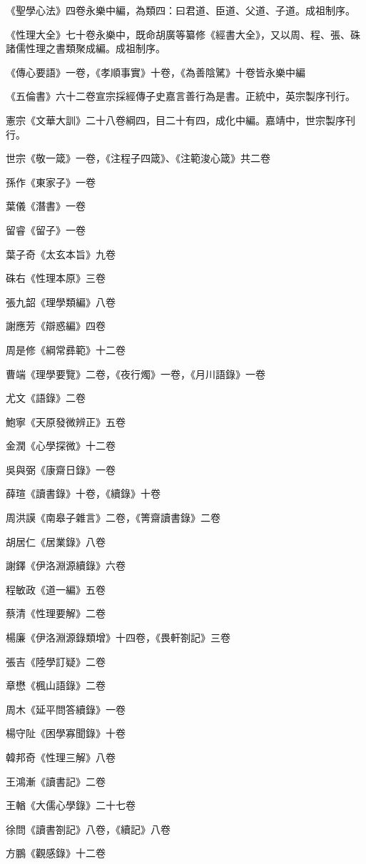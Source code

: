 《聖學心法》四卷永樂中編，為類四：曰君道、臣道、父道、子道。成祖制序。

《性理大全》七十卷永樂中，既命胡廣等纂修《經書大全》，又以周、程、張、硃諸儒性理之書類聚成編。成祖制序。

《傳心要語》一卷，《孝順事實》十卷，《為善陰騭》十卷皆永樂中編

《五倫書》六十二卷宣宗採經傳子史嘉言善行為是書。正統中，英宗製序刊行。

憲宗《文華大訓》二十八卷綱四，目二十有四，成化中編。嘉靖中，世宗製序刊行。

世宗《敬一箴》一卷，《注程子四箴》、《注範浚心箴》共二卷

孫作《東家子》一卷

葉儀《潛書》一卷

留睿《留子》一卷

葉子奇《太玄本旨》九卷

硃右《性理本原》三卷

張九韶《理學類編》八卷

謝應芳《辯惑編》四卷

周是修《綱常彞範》十二卷

曹端《理學要覽》二卷，《夜行燭》一卷，《月川語錄》一卷

尤文《語錄》二卷

鮑寧《天原發微辨正》五卷

金潤《心學探微》十二卷

吳與弼《康齋日錄》一卷

薛瑄《讀書錄》十卷，《續錄》十卷

周洪謨《南皋子雜言》二卷，《箐齋讀書錄》二卷

胡居仁《居業錄》八卷

謝鐸《伊洛淵源續錄》六卷

程敏政《道一編》五卷

蔡清《性理要解》二卷

楊廉《伊洛淵源錄類增》十四卷，《畏軒劄記》三卷

張吉《陸學訂疑》二卷

章懋《楓山語錄》二卷

周木《延平問答續錄》一卷

楊守阯《困學寡聞錄》十卷

韓邦奇《性理三解》八卷

王鴻漸《讀書記》二卷

王輶《大儒心學錄》二十七卷

徐問《讀書劄記》八卷，《續記》八卷

方鵬《觀感錄》十二卷

